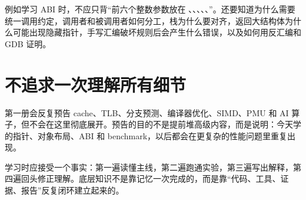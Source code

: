 例如学习 ABI 时，不应只背“前六个整数参数放在 、、、、、”。还要知道为什么需要统一调用约定，调用者和被调用者如何分工，栈为什么要对齐，返回大结构体为什么可能出现隐藏指针，手写汇编破坏规则后会产生什么错误，以及如何用反汇编和 GDB 证明。

\section*{不追求一次理解所有细节}

第一册会反复预告 cache、TLB、分支预测、编译器优化、SIMD、PMU 和 AI 算子，但不会在这里彻底展开。预告的目的不是提前堆高级内容，而是说明：今天学的指针、对象布局、ABI 和 benchmark，以后都会在更复杂的性能问题里重复出现。

学习时应接受一个事实：第一遍读懂主线，第二遍跑通实验，第三遍写出解释，第四遍回头修正理解。底层知识不是靠记忆一次完成的，而是靠“代码、工具、证据、报告”反复闭环建立起来的。
